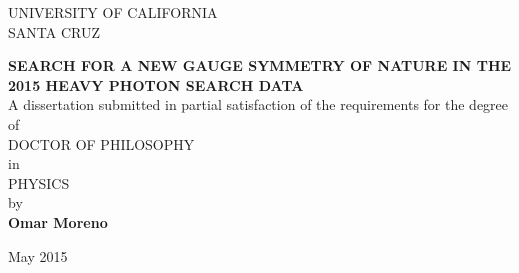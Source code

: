 

\begin{center}
    UNIVERSITY OF CALIFORNIA \\
    SANTA CRUZ

    \textbf{SEARCH FOR A NEW GAUGE SYMMETRY OF NATURE IN THE 2015 HEAVY PHOTON
            SEARCH DATA} \\

    A dissertation submitted in partial satisfaction of the requirements for the
    degree of \\

    DOCTOR OF PHILOSOPHY \\

    in \\

    PHYSICS \\

    by \\

    \textbf{Omar Moreno}

    May 2015
\end{center}

\newpage
